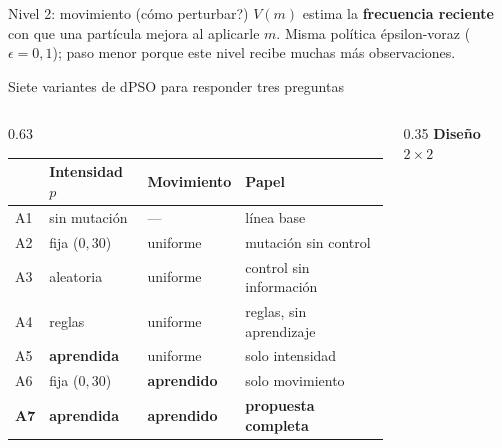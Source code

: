 \documentclass[aspectratio=169,11pt]{beamer}
\newcommand{\best}[1]{\textcolor{best}{\textbf{#1}}}
\newcommand{\destacado}[1]{\textcolor{primary}{\textbf{#1}}}
\newcommand{\dc}{{,}}%
\begin{document}
\begin{frame}{Nivel 2: movimiento (\textquestiondown{}cómo perturbar?)}
  \vspace{0.2cm}
  \centering
  \small
  $V(m)$ estima la \destacado{frecuencia reciente} con que una partícula mejora al aplicarle $m$. Misma política épsilon-voraz ($\epsilon=0\dc1$); paso menor porque este nivel recibe muchas más observaciones.
\end{frame}

\begin{frame}{Siete variantes de dPSO para responder tres preguntas}
  \begin{columns}[c]
    \begin{column}{0.63\textwidth}
      \centering
      \footnotesize
      \setlength{\tabcolsep}{4pt}
      \renewcommand{\arraystretch}{1.25}
      \begin{tabular}{@{}llll@{}}
        \toprule
        & \textbf{Intensidad $p$} & \textbf{Movimiento} & \textbf{Papel} \\
        \midrule
        A1 & sin mutación & --- & línea base \\
        A2 & fija ($0\dc30$) & uniforme & mutación sin control \\
        A3 & aleatoria & uniforme & control sin información \\
        A4 & reglas & uniforme & reglas, sin aprendizaje \\
        A5 & \textcolor{accent}{\textbf{aprendida}} & uniforme & solo intensidad \\
        A6 & fija ($0\dc30$) & \textcolor{accent}{\textbf{aprendido}} & solo movimiento \\
        \best{A7} & \textcolor{accent}{\textbf{aprendida}} & \textcolor{accent}{\textbf{aprendido}} & \best{propuesta completa} \\
        \bottomrule
      \end{tabular}
    \end{column}

    \begin{column}{0.35\textwidth}
      \centering
      {\small\destacado{Diseño $2\times2$}}


\end{column}
\end{columns}
\end{frame}
\end{document}
